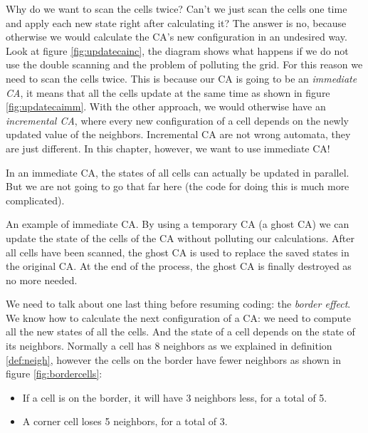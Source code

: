 Why do we want to scan the cells twice? Can't we just scan the cells one time and apply each new state
right after calculating it? The answer is no, because otherwise we would calculate the CA's new configuration
in an undesired way. Look at figure \ref{fig:updatecainc},
the diagram shows what happens if we do not use the double
scanning and the problem of polluting the grid. For this reason we need to scan the cells twice. This is because
our CA is going to be an \textit{immediate CA}, it means that all the cells update at the same time
as shown in figure \ref{fig:updatecaimm}.
With the other
approach, we would otherwise have an \textit{incremental CA}, where every new configuration of a cell depends on the
newly updated value of the neighbors. Incremental CA are not wrong automata,
they are just different. In this chapter, however, we want to use immediate CA!

In an immediate CA, the states of all cells can actually be updated in parallel. But we are not going to go
that far here (the code for doing this is much more complicated).

%
\begin{marginfigure}[0.25cm]
  
  \caption[Example of immediate CA]{An example of immediate CA. By using a temporary CA (a ghost CA) we can update
  the state of the cells of the CA without polluting our calculations. After all cells have been scanned, the
  ghost CA is used to replace the saved states in the original CA. At the end of the process, the ghost CA is
  finally destroyed as no more needed.}
  \label{fig:updatecaimm}
\end{marginfigure}
%

We need to talk about one last thing before resuming coding: the \textit{border effect}. We know how to
calculate the next configuration of a CA: we need to compute all the new states of all the cells. And the state
of a cell depends on the state of its neighbors. Normally a cell has 8 neighbors as we explained in definition
\ref{def:neigh}, however the cells on the border have fewer neighbors as shown in figure \ref{fig:bordercells}:

\begin{itemize}
\item If a cell is on the border, it will have 3 neighbors less, for a total of 5.
\item A corner cell loses 5 neighbors, for a total of 3.
\end{itemize}

